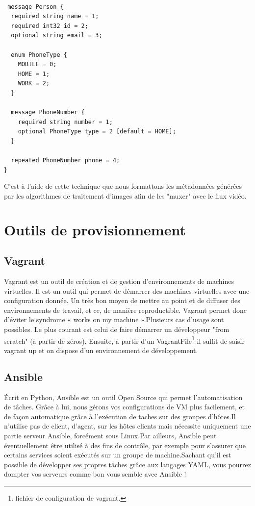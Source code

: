 \begin{lstlisting}[language=protobuf2,style=protobuf , frame=single,caption=modèle pour la structure d'un message,label=proto1]

 message Person {
  required string name = 1;
  required int32 id = 2;
  optional string email = 3;

  enum PhoneType {
    MOBILE = 0;
    HOME = 1;
    WORK = 2;
  }

  message PhoneNumber {
    required string number = 1;
    optional PhoneType type = 2 [default = HOME];
  }

  repeated PhoneNumber phone = 4;
}
\end{lstlisting}

C'est à l'aide de cette technique que nous formattons les métadonnées générées par les algorithmes de traitement d'images afin de les "muxer" avec le flux vidéo.

\section{Outils de provisionnement}

\subsection{Vagrant}
Vagrant est un outil de création et de gestion d'environnements de machines virtuelles. Il est un outil qui permet de démarrer des machines virtuelles avec une configuration donnée. Un très bon moyen de mettre au point et de diffuser des environnements de travail, et ce, de manière reproductible. Vagrant permet donc d'éviter le syndrome « works on my machine ».Plusieurs cas d'usage sont possibles. Le plus courant est celui de faire démarrer un développeur "from scratch" (à partir de zéros). Ensuite, à partir d'un VagrantFile\footnote{fichier de configuration de vagrant.} il suffit de saisir vagrant up et on dispose d'un environnement de développement.

\subsection{Ansible}
Écrit en Python, Ansible est un outil Open Source qui permet l’automatisation de tâches. Grâce à lui, nous gérons vos configurations de VM plus facilement, et de façon automatique grâce à l’exécution de taches sur des groupes d’hôtes.Il n’utilise pas de client, d’agent, sur les hôtes clients mais nécessite uniquement une partie serveur Ansible, forcément sous Linux.Par ailleurs, Ansible peut éventuellement être utilisé à des fins de contrôle, par exemple pour s’assurer que certains services soient exécutés sur un groupe de machine.Sachant qu’il est possible de développer ses propres tâches grâce aux langages YAML, vous pourrez dompter vos serveurs comme bon vous semble avec Ansible !



